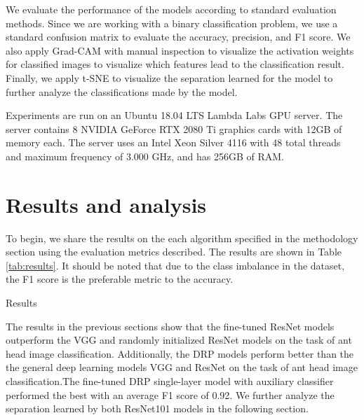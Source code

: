 \documentclass{aci}
\numberwithin{equation}{section}
\begin{document}

We evaluate the performance of the models according to standard evaluation
methods. Since we are working with a binary classification problem, we use a
standard confusion matrix to evaluate the accuracy, precision, and F1 score. We
also apply Grad-CAM with manual inspection to visualize the activation weights
for classified images to visualize which features lead to the classification
result. Finally, we apply t-SNE to visualize the separation learned for the
model to further analyze the classifications made by the model.


Experiments are run on an Ubuntu 18.04 LTS Lambda Labs GPU server. The server
contains 8 NVIDIA GeForce RTX 2080 Ti graphics cards with 12GB of memory each.
The server uses an Intel Xeon Silver 4116 with 48 total threads and maximum
frequency of 3.000 GHz, and has 256GB of RAM.

\section{Results and analysis}


To begin, we share the results on the each algorithm specified in the
methodology section using the evaluation metrics described. The results are
shown in Table \ref{tab:results}. It should be noted that due to the class
imbalance in the dataset, the F1 score is the preferable metric to the accuracy.

\begin{table}[h]
    \centering
    \caption{Results}
    
    \label{tab:results}
\end{table}

\FloatBarrier
The results in the previous sections show that the fine-tuned ResNet models
outperform the VGG and randomly initialized ResNet models on the task of ant
head image classification. Additionally, the DRP models perform better than the
the general deep learning models VGG and ResNet on the task of ant head image
classification.The fine-tuned DRP single-layer model with auxiliary classifier
performed the best with an average F1 score of 0.92. We further analyze the
separation learned by both ResNet101 models in the following section.
\end{document}
